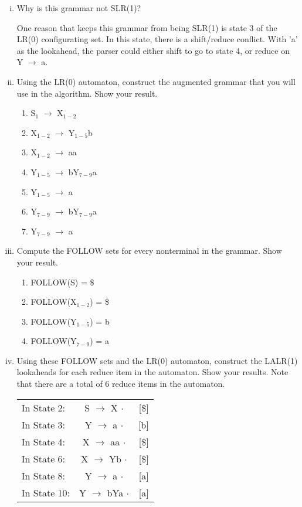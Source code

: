 \documentclass{article}
\begin{document}
\begin{enumerate}[i.]
	\item Why is this grammar not SLR(1)?

		One reason that keeps this grammar from being SLR(1) is state 3
		of the LR(0) configurating set. In this state, there is a
		shift/reduce conflict. With 'a' as the lookahead, the parser
		could either shift to go to state 4, or reduce on Y $\to$ a.

	\item Using the LR(0) automaton, construct the augmented grammar that
		you will use in the algorithm. Show your result.

		\begin{enumerate}[(1)]
			\item S$_1$ $\to$ X$_{1-2}$
			\item X$_{1-2}$ $\to$ Y$_{1-5}$b
			\item X$_{1-2}$ $\to$ aa
			\item Y$_{1-5}$ $\to$ bY$_{7-9}$a
			\item Y$_{1-5}$ $\to$ a
			\item Y$_{7-9}$ $\to$ bY$_{7-9}$a
			\item Y$_{7-9}$ $\to$ a
		\end{enumerate}

	\item Compute the FOLLOW sets for every nonterminal in the grammar.
		Show your result.

		\begin{enumerate}[(1)]
			\item FOLLOW(S) = \$
			\item FOLLOW(X$_{1-2}$) = \$
			\item FOLLOW(Y$_{1-5}$) = b
			\item FOLLOW(Y$_{7-9}$) = a
		\end{enumerate}

	\item Using these FOLLOW sets and the LR(0) automaton, construct the
		LALR(1) lookaheads for each reduce item in the automaton. Show
		your results. Note that there are a total of 6 reduce items in
		the automaton.

		\begin{tabular}{lcr}
			In State  2: & S $\to$  X  $\cdot$ & [\$] \\
			In State  3: & Y $\to$  a  $\cdot$ & [b]  \\
			In State  4: & X $\to$ aa  $\cdot$ & [\$] \\
			In State  6: & X $\to$ Yb  $\cdot$ & [\$] \\
			In State  8: & Y $\to$  a  $\cdot$ & [a]  \\
			In State 10: & Y $\to$ bYa $\cdot$ & [a]  \\
		\end{tabular}
\end{enumerate}
\end{document}
